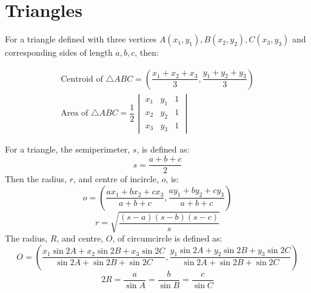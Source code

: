 \chapter{Triangles}
For a triangle defined with three vertices $A(x_1,y_1),B(x_2,y_2),C(x_3,y_3)$ and corresponding sides of length $a,b,c$, then:

\begin{align}
	\text{Centroid of }\triangle ABC=(\dfrac{x_1+x_2+x_3}{3},\dfrac{y_1+y_2+y_3}{3})\\
	\text{Area of }\triangle ABC=\dfrac{1}{2}\begin{vmatrix}x_1&y_1&1\\x_2&y_2&1\\x_3&y_3&1\end{vmatrix}
\end{align}

For a triangle, the semiperimeter, $s$, is defined as:
\begin{equation}
	s=\dfrac{a+b+c}{2}\nonumber
\end{equation}
Then the radius, $r$, and centre of incircle, $o$, is:
\begin{equation}
	o=\left(\dfrac{ax_1+bx_2+cx_3}{a+b+c},\dfrac{ay_1+by_2+cy_3}{a+b+c}\right)
\end{equation}
\begin{equation}
	r=\sqrt{\dfrac{(s-a)(s-b)(s-c)}{s}}
\end{equation}
The radius, $R$, and centre, $O$, of circumcircle is defined as:
\begin{equation}
	O = \left( \dfrac{x_1 \sin 2A + x_2 \sin 2B + x_3 \sin 2C}{\sin 2A + \sin 2B + \sin 2C}, \dfrac{y_1 \sin 2A + y_2 \sin 2B + y_3 \sin 2C}{\sin 2A + \sin 2B + \sin 2C} \right)
\end{equation}
\begin{equation}
	2R = \dfrac{a}{\sin A} = \dfrac{b}{\sin B} = \dfrac{c}{\sin C}
\end{equation}
